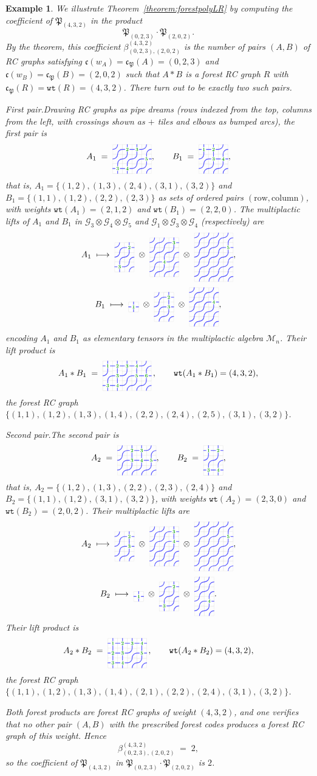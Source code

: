 \documentclass[pdflatex,sn-mathphys-num]{sn-jnl}
\numberwithin{equation}{subsection}
\newcommand{\wof}[1]{w_{#1}}
\newcommand{\wtt}{\mathtt{wt}}
\newcommand{\grass}{\mathcal{G}}
\newcommand{\code}{\mathfrak{c}}
\newcommand{\forest}{\mathfrak{P}}
\theoremstyle{thmstyleone}
\theoremstyle{thmstylethree}
\newtheorem{example}[lemma]{Example}
\theoremstyle{thmstyletwo}
\begin{document}
\begin{example}\label{example:forestlrproduct}
We illustrate Theorem~\ref{theorem:forestpolyLR} by computing the coefficient of $\forest_{(4,3,2)}$ in the product
$$\forest_{(0,2,3)}\cdot\forest_{(2,0,2)}.$$
By the theorem, this coefficient $\beta_{(0,2,3),(2,0,2)}^{(4,3,2)}$ is the number of pairs $(A,B)$ of RC graphs satisfying $\code(\wof{A})=\code_\forest(A)=(0,2,3)$ and $\code(\wof{B})=\code_\forest(B)=(2,0,2)$ such that $A*B$ is a forest RC graph $R$ with $\code_\forest(R)=\wtt(R)=(4,3,2)$. There turn out to be exactly two such pairs.

\smallskip
\noindent\emph{First pair.}\quad Drawing RC graphs as pipe dreams (rows indexed from the top, columns from the left, with crossings shown as $+$ tiles and elbows as bumped arcs), the first pair is
$$A_1 \;=\; \pd{3}{4}{1/2,1/3,2/4,3/1,3/2}, \qquad B_1 \;=\; \pd{3}{3}{1/1,1/2,2/2,2/3},$$
that is, $A_1=\{(1,2),(1,3),(2,4),(3,1),(3,2)\}$ and $B_1=\{(1,1),(1,2),(2,2),(2,3)\}$ as sets of ordered pairs $(\text{row},\text{column})$, with weights $\wtt(A_1)=(2,1,2)$ and $\wtt(B_1)=(2,2,0)$. The multiplactic lifts of $A_1$ and $B_1$ in $\grass_3\otimes\grass_4\otimes\grass_5$ and $\grass_1\otimes\grass_3\otimes\grass_4$ (respectively) are
$$A_1 \;\longmapsto\; \pd{3}{2}{1/2,3/1}\;\otimes\;\pd{4}{3}{1/3,3/2}\;\otimes\;\pd{5}{4}{2/4},$$
$$B_1 \;\longmapsto\; \pd{1}{1}{1/1}\;\otimes\;\pd{3}{2}{1/2,2/2}\;\otimes\;\pd{4}{3}{2/3},$$
encoding $A_1$ and $B_1$ as elementary tensors in the multiplactic algebra $\mathcal{M}_n$. Their lift product is
$$A_1 * B_1 \;=\; \pd{3}{5}{1/1,1/2,1/3,1/4,2/2,2/4,2/5,3/1,3/2}\,, \qquad \wtt(A_1*B_1)=(4,3,2),$$
the forest RC graph $\{(1,1),(1,2),(1,3),(1,4),(2,2),(2,4),(2,5),(3,1),(3,2)\}$.

\smallskip
\noindent\emph{Second pair.}\quad The second pair is
$$A_2 \;=\; \pd{3}{4}{1/2,1/3,2/2,2/3,2/4}, \qquad B_2 \;=\; \pd{3}{2}{1/1,1/2,3/1,3/2},$$
that is, $A_2=\{(1,2),(1,3),(2,2),(2,3),(2,4)\}$ and $B_2=\{(1,1),(1,2),(3,1),(3,2)\}$, with weights $\wtt(A_2)=(2,3,0)$ and $\wtt(B_2)=(2,0,2)$. Their multiplactic lifts are
$$A_2 \;\longmapsto\; \pd{3}{2}{1/2,2/2}\;\otimes\;\pd{4}{3}{1/3,2/3}\;\otimes\;\pd{5}{4}{2/4},$$
$$B_2 \;\longmapsto\; \pd{1}{1}{1/1}\;\otimes\;\pd{3}{2}{1/2,3/1}\;\otimes\;\pd{4}{2}{3/2}.$$
Their lift product is
$$A_2 * B_2 \;=\; \pd{3}{4}{1/1,1/2,1/3,1/4,2/1,2/2,2/4,3/1,3/2}\,, \qquad \wtt(A_2*B_2)=(4,3,2),$$
the forest RC graph $\{(1,1),(1,2),(1,3),(1,4),(2,1),(2,2),(2,4),(3,1),(3,2)\}$.

\smallskip
Both forest products are forest RC graphs of weight $(4,3,2)$, and one verifies that no other pair $(A,B)$ with the prescribed forest codes produces a forest RC graph of this weight. Hence
$$\beta_{(0,2,3),(2,0,2)}^{(4,3,2)} \;=\; 2,$$
so the coefficient of $\forest_{(4,3,2)}$ in $\forest_{(0,2,3)}\cdot\forest_{(2,0,2)}$ is $2$.

\end{example}
\end{document}

